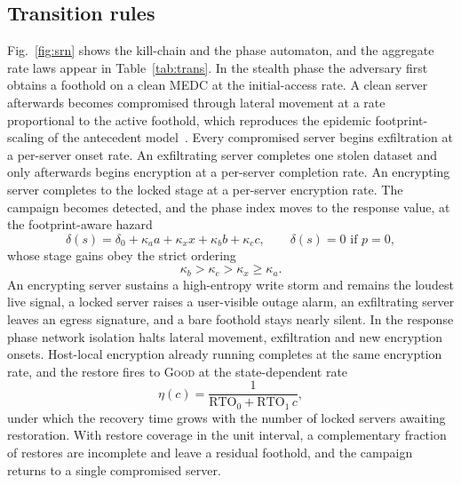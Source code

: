 \documentclass[journal]{IEEEtran}
\begin{document}
\subsection{Transition rules}
Fig.~\ref{fig:srn} shows the kill-chain and the phase automaton, and the
aggregate rate laws appear in Table~\ref{tab:trans}. In the stealth phase the
adversary first obtains a foothold on a clean MEDC at the initial-access rate. A
clean server afterwards becomes compromised through lateral movement at a rate
proportional to the active foothold, which reproduces the epidemic
footprint-scaling of the antecedent model~\cite{liu2021transient}. Every
compromised server begins exfiltration at a per-server onset rate. An
exfiltrating server completes one stolen dataset and only afterwards begins
encryption at a per-server completion rate. An encrypting server completes to
the locked stage at a per-server encryption rate. The campaign becomes detected,
and the phase index moves to the response value, at the footprint-aware hazard
\begin{equation}
\delta(s)=\delta_0+\kappa_a a+\kappa_x x+\kappa_b b+\kappa_c c,\qquad
\delta(s)\!=\!0 \text{ if } p{=}0,
\label{eq:delta}
\end{equation}
whose stage gains obey the strict ordering
\begin{equation}
\kappa_b>\kappa_c>\kappa_x\ge\kappa_a .
\label{eq:korder}
\end{equation}
An encrypting server sustains a high-entropy write storm and remains the loudest
live signal, a locked server raises a user-visible outage alarm, an exfiltrating
server leaves an egress signature, and a bare foothold stays nearly silent. In the response
phase network isolation halts lateral movement, exfiltration and new encryption
onsets. Host-local encryption already running completes at the same encryption
rate, and the restore fires to \textsc{Good} at the state-dependent rate
\begin{equation}
\eta(c)=\frac{1}{\mathrm{RTO}_0+\mathrm{RTO}_1\,c},
\label{eq:eta}
\end{equation}
under which the recovery time grows with the number of locked servers awaiting
restoration. With restore coverage in the unit interval, a complementary
fraction of restores are incomplete and leave a residual foothold, and the
campaign returns to a single compromised server.
\end{document}
